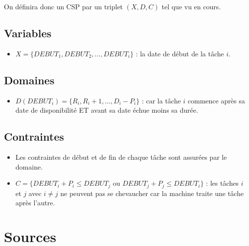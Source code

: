 \documentclass{latexPackage/utc-report/utc-report}
\begin{document}
On définira donc un CSP par un triplet $(X, D, C)$ tel que vu en cours.

\subsection{Variables}

\begin{itemize}
    \item $X = \{DEBUT_1, DEBUT_2, ... , DEBUT_i\}$ : la date de début de la tâche $i$.
\end{itemize}

\subsection{Domaines}

\begin{itemize}
    \item $D(DEBUT_i) = \{R_i, R_i + 1, ..., D_i - P_i\}$ : car la tâche $i$ commence après sa date de disponibilité ET avant sa date échue moins sa durée.
\end{itemize}

\subsection{Contraintes}

\begin{itemize}
    \item Les contraintes de début et de fin de chaque tâche sont assurées par le domaine.
    \item $C = \{DEBUT_i + P_i \leq DEBUT_j \text{ ou } DEBUT_j + P_j \leq DEBUT_i\}$ : les tâches $i$ et $j$ avec $i \neq j$ ne peuvent pas se chevaucher car la machine traite une tâche après l'autre.
\end{itemize}

\pagebreak

\section{Sources}

\pagebreak

\listoffigures
\end{document}
